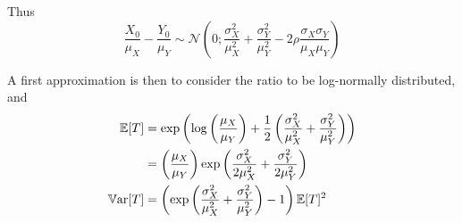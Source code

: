 \documentclass[../../Main_ManuscritThese.tex]{subfiles}
\begin{document}
  Thus
  \begin{equation}
    \frac{X_0}{\mu_X} - \frac{Y_0}{\mu_Y} \sim \mathcal{N}\left(0;\frac{\sigma^2_X}{\mu_X^2} + \frac{\sigma^2_Y}{\mu_Y^2} - 2 \rho \frac{\sigma_X \sigma_Y}{\mu_X \mu_Y} \right)
  \end{equation}
  
  A first approximation is then to consider the ratio to be log-normally distributed, and
  \begin{align}
    \mathbb{E}[T] &= \exp\left(\log\left(\frac{\mu_X}{\mu_Y}\right) + \frac{1}{2}\left(\frac{\sigma_X^2}{\mu_X^2}+\frac{\sigma_Y^2}{\mu_Y^2} \right)\right)\\
           &=\left(\frac{\mu_X}{\mu_Y}\right) \exp\left(\frac{\sigma_X^2}{2\mu_X^2}+\frac{\sigma_Y^2}{2\mu_Y^2}\right) \\
    \mathbb{V}\mathrm{ar}[T] &= \left(\exp\left(\frac{\sigma_X^2}{\mu_X^2}+\frac{\sigma_Y^2}{\mu_Y^2}\right)-1 \right)\mathbb{E}[T]^2
  \end{align}


\end{document}
